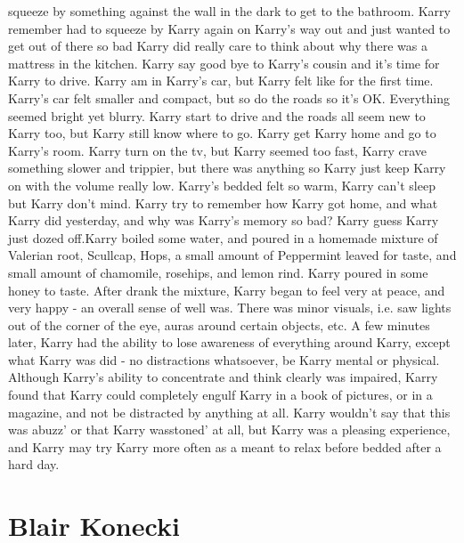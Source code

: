 \documentclass[12pt]{book}
\begin{document}
squeeze by something against the wall in the dark to get to the bathroom. Karry remember had to squeeze by Karry again on Karry's way out and just wanted to get out of there so bad Karry did really care to think about why there was a mattress in the kitchen. Karry say good bye to Karry's cousin and it's time for Karry to drive. Karry am in Karry's car, but Karry felt like for the first time. Karry's car felt smaller and compact, but so do the roads so it's OK. Everything seemed bright yet blurry. Karry start to drive and the roads all seem new to Karry too, but Karry still know where to go. Karry get Karry home and go to Karry's room. Karry turn on the tv, but Karry seemed too fast, Karry crave something slower and trippier, but there was anything so Karry just keep Karry on with the volume really low. Karry's bedded felt so warm, Karry can't sleep but Karry don't mind. Karry try to remember how Karry got home, and what Karry did yesterday, and why was Karry's memory so bad? Karry guess Karry just dozed off.Karry boiled some water, and poured in a homemade mixture of Valerian root, Scullcap, Hops, a small amount of Peppermint leaved for taste, and small amount of chamomile, rosehips, and lemon rind. Karry poured in some honey to taste. After drank the mixture, Karry began to feel very at peace, and very happy - an overall sense of well was. There was minor visuals, i.e. saw lights out of the corner of the eye, auras around certain objects, etc. A few minutes later, Karry had the ability to lose awareness of everything around Karry, except what Karry was did - no distractions whatsoever, be Karry mental or physical. Although Karry's ability to concentrate and think clearly was impaired, Karry found that Karry could completely engulf Karry in a book of pictures, or in a magazine, and not be distracted by anything at all. Karry wouldn't say that this was abuzz' or that Karry wasstoned' at all, but Karry was a pleasing experience, and Karry may try Karry more often as a meant to relax before bedded after a hard day.



\chapter{Blair Konecki}
\end{document}
